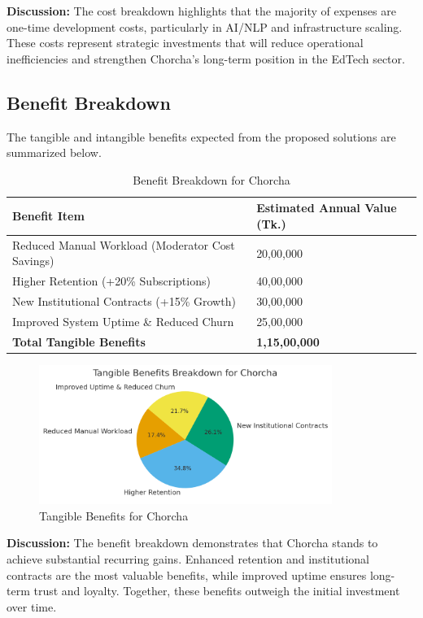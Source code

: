 \documentclass[12pt,a4paper,oneside]{book}
\begin{document}
\textbf{Discussion:}
The cost breakdown highlights that the majority of expenses are one-time development costs, particularly in AI/NLP and infrastructure scaling. These costs represent strategic investments that will reduce operational inefficiencies and strengthen Chorcha’s long-term position in the EdTech sector.

\subsection{Benefit Breakdown}

The tangible and intangible benefits expected from the proposed solutions are summarized below.

\begin{table}[H]
\centering
\caption{Benefit Breakdown for Chorcha}
\small
\begin{tabular}{|L{7.5cm}|C{3cm}|}
\hline
\textbf{Benefit Item} & \textbf{Estimated Annual Value (Tk.)} \\
\hline
Reduced Manual Workload (Moderator Cost Savings) & 20,00,000 \\
\hline
Higher Retention (+20\% Subscriptions) & 40,00,000 \\
\hline
New Institutional Contracts (+15\% Growth) & 30,00,000 \\
\hline
Improved System Uptime \& Reduced Churn & 25,00,000 \\
\hline
\textbf{Total Tangible Benefits} & \textbf{1,15,00,000} \\
\hline
\end{tabular}
\end{table}

\begin{figure}[H]
    \centering
    \includegraphics[width=0.85\textwidth]{output (3).png}
    \caption{Tangible Benefits for Chorcha}
    \end{figure}

\textbf{Discussion:}
The benefit breakdown demonstrates that Chorcha stands to achieve substantial recurring gains. Enhanced retention and institutional contracts are the most valuable benefits, while improved uptime ensures long-term trust and loyalty. Together, these benefits outweigh the initial investment over time.
\end{document}
